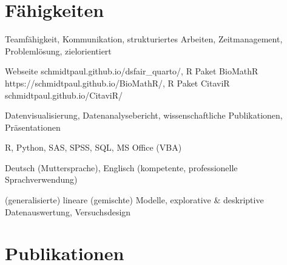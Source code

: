 \documentclass[11pt,a4paper,]{awesome-cv}
\begin{document}
\section{Fähigkeiten}\label{fuxe4higkeiten}

\begin{cvskills} 
{Teamfähigkeit, Kommunikation, strukturiertes Arbeiten, Zeitmanagement, Problemlösung, zielorientiert} 

{Webseite schmidtpaul.github.io/dsfair\_quarto/, R Paket BioMathR https://schmidtpaul.github.io/BioMathR/, R Paket CitaviR schmidtpaul.github.io/CitaviR/} 

{Datenvisualisierung, Datenanalysebericht, wissenschaftliche Publikationen, Präsentationen} 

{R, Python, SAS, SPSS, SQL, MS Office (VBA)} 

{Deutsch (Muttersprache), Englisch (kompetente, professionelle Sprachverwendung)} 

{(generalisierte) lineare (gemischte) Modelle, explorative \& deskriptive Datenauswertung, Versuchsdesign} 
\end{cvskills}

\section{Publikationen}\label{publikationen}

\footnotesize
\end{document}
